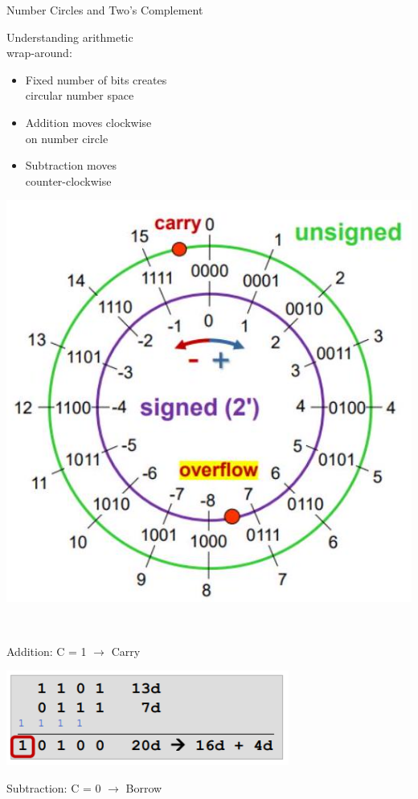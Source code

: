 \begin{concept}{Number Circles and Two's Complement}

\begin{minipage}{0.45\linewidth}
  Understanding arithmetic\\ wrap-around:
\begin{itemize}
  \item Fixed number of bits creates \\circular number space
  \item Addition moves clockwise \\on number circle
  \item Subtraction moves \\counter-clockwise
\end{itemize}
\end{minipage}
\begin{minipage}{0.5\linewidth}
\includegraphics[width=\linewidth]{images/2024_12_29_79e6b22f503fb7b4f718g-04(2)}
\end{minipage}
\vspace{2mm}\\
\begin{minipage}[t]{0.4\linewidth}
Addition: C = 1 $\rightarrow$ Carry

\includegraphics[width=\linewidth]{images/addcarry.png}
\end{minipage}
\begin{minipage}[t]{0.55\linewidth}
Subtraction: C = 0 $\rightarrow$ Borrow


\end{minipage}
\end{concept}
